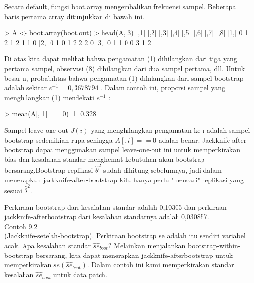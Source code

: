 \documentclass[a4paper,12pt]{article}
\theoremstyle{definition}
\begin{document}
Secara default, fungsi boot.array mengembalikan frekuensi sampel. Beberapa baris pertama array ditunjukkan di bawah ini.\\

\begin{spverbatim}
> A <- boot.array(boot.out)
> head(A, 3)
[,1] [,2] [,3] [,4] [,5] [,6] [,7] [,8]
[1,] 0 1 2 1 2 1 1 0
[2,] 0 1 0 1 2 2 2 0
[3,] 0 1 1 0 0 3 1 2
\end{spverbatim}

Di atas kita dapat melihat bahwa pengamatan (1) dihilangkan dari tiga yang pertama sampel, observasi (8) dihilangkan dari dua sampel pertama, dll. Untuk besar n, probabilitas bahwa pengamatan (1) dihilangkan dari sampel bootstrap adalah sekitar $e^{-1}=0,3678794$ . Dalam contoh ini, proporsi sampel yang menghilangkan (1) mendekati $e^{-1}$ :\\

\begin{spverbatim}
> mean(A[, 1] == 0)
[1] 0.328
\end{spverbatim}

Sampel leave-one-out $J(i)$ yang menghilangkan pengamatan ke-i adalah sampel bootstrap sedemikian rupa sehingga $A[ ,i] == 0$ adalah benar. Jackknife-after-bootstrap dapat menggunakan sampel leave-one-out ini untuk memperkirakan bias dan kesalahan standar menghemat kebutuhan akan bootstrap bersarang.Bootstrap replikasi $\widehat{\theta}^{2}$ sudah dihitung sebelumnya, jadi dalam menerapkan jackknife-after-bootstrap kita hanya perlu "mencari" replikasi yang sesuai $\widehat{\theta}^{2}$.\\ 


Perkiraan bootstrap dari kesalahan standar adalah 0,10305 dan perkiraan jackknife-afterbootstrap dari kesalahan standarnya adalah 0,030857.\\

Contoh 9.2\\
(Jackknife-setelah-bootstrap). Perkiraan bootstrap se adalah itu sendiri variabel acak. Apa kesalahan standar $_{boot}$? Melainkan menjalankan bootstrap-within-bootstrap bersarang, kita dapat menerapkan jackknife-afterbootstrap untuk memperkirakan $se(_{boot})$. Dalam contoh ini kami memperkirakan standar kesalahan $_{boot}$ untuk data patch.\\
\end{document}
